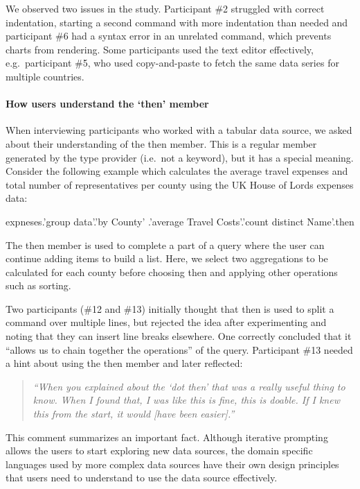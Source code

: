 \documentclass[manuscript,review,anonymous]{acmart}
\newcommand{\ikvd}[1]{{\fontfamily{zi4}\selectfont\small #1}}
\begin{document}
We observed two issues in the study. Participant \#2 struggled with correct indentation, starting a second command
with more indentation than needed and participant \#6 had a syntax error in an unrelated command,
which prevents charts from rendering. Some participants used the text editor effectively,
e.g.~participant \#5, who used copy-and-paste to fetch the same data series for multiple countries.


\paragraph{How users understand the `then' member}
When interviewing participants who worked with a tabular data source, we
asked about their understanding of the \ikvd{then} member. This is a regular member generated by the
type provider (i.e.~not a keyword), but it has a special meaning. Consider
the following example which calculates the average travel expenses and total number of
representatives per county using the UK House of Lords expenses data:

\begin{thegamma}
expneses.'group data'.'by County'
  .'average Travel Costs'.'count distinct Name'.then
\end{thegamma}

The \ikvd{then} member is used to complete a part of a query where the user can continue
adding items to build a list. Here, we select two aggregations to be calculated for each
county before choosing \ikvd{then} and applying other operations such as sorting.

Two participants (\#12 and \#13) initially thought that \ikvd{then} is used to split a command
over multiple lines, but rejected the idea after experimenting and noting that they can insert
line breaks elsewhere. One correctly concluded that it ``allows us to chain together the
operations'' of the query. Participant \#13 needed a hint about using the
\ikvd{then} member and later reflected:

\begin{quote}
  \emph{``When you explained about the `dot then' that was a really useful thing to know.
  When I found that, I was like this is fine, this is doable. If I knew this from the start,
  it would [have been easier].''}
\end{quote}

This comment summarizes an important fact. Although iterative prompting allows the users to start
exploring new data sources, the domain specific languages used by more complex data sources have
their own design principles that users need to understand to use the data source effectively.
\end{document}
